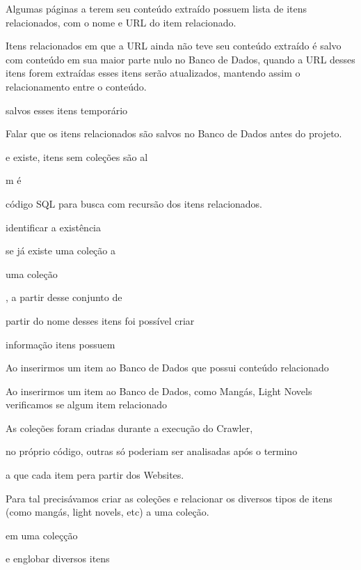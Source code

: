 \documentclass[12pt]{article}
\begin{document}
Algumas páginas a terem seu conteúdo extraído possuem lista de itens relacionados, com o nome e URL do item relacionado.

Itens relacionados em que a URL ainda não teve seu conteúdo extraído é salvo com conteúdo em sua maior parte nulo no Banco de Dados, quando a URL desses itens forem extraídas esses itens serão atualizados, mantendo assim o relacionamento entre o conteúdo.


salvos esses itens temporário


Falar que os itens relacionados são salvos no Banco de Dados antes do projeto.
 


e existe, itens sem coleções são al

m é 

código SQL para busca com recursão dos itens relacionados.


identificar a existência 

se já existe uma coleção a 

uma coleção 


, a partir desse conjunto de 

 partir do nome desses itens foi possível criar 

informação  itens possuem 

Ao inserirmos um item ao Banco de Dados que possui conteúdo relacionado 

Ao inserirmos um item ao Banco de Dados, como Mangás, Light Novels verificamos se algum item relacionado

As coleções foram criadas durante a execução do Crawler, 

 no próprio código, outras só poderiam ser analisadas após o termino 

 a que cada item pera partir dos Websites.


Para tal precisávamos criar as coleções e relacionar os diversos tipos de itens (como mangás, light novels, etc) a uma coleção.



em uma coleçção


e englobar diversos itens
\end{document}
